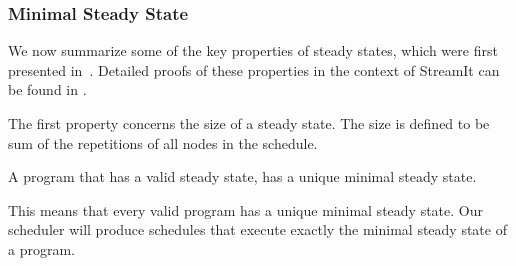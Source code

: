 \subsubsection{Minimal Steady State}

We now summarize some of the key properties of steady states, which
were first presented in~\cite{lee87static}.  Detailed proofs of these
properties in the context of StreamIt can be found in
\cite{karczma-thesis}.




The first property concerns the size of a steady state.  The size is
defined to be sum of the repetitions of all nodes in the schedule.

\begin{theorem}
A {\StreamIt} program that has a valid steady state, has a unique
minimal steady state.
\end{theorem}

This means that every valid {\StreamIt} program has a unique minimal
steady state. Our scheduler will produce schedules that execute
exactly the minimal steady state of a program.


